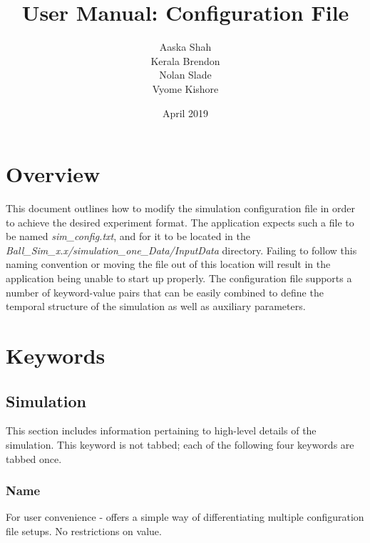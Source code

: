 \documentclass{article}
\title{User Manual: Configuration File}
\author{Aaska Shah\\Kerala Brendon\\Nolan Slade\\Vyome Kishore}
\date{April 2019}
\begin{document}
\maketitle

\section*{Overview}
This document outlines how to modify the simulation configuration file in order to achieve the desired experiment format. The application expects such a file to be named \textit{sim\_config.txt}, and for it to be located in the \textit{Ball\_Sim\_x.x\slash simulation\_one\_Data\slash InputData} directory. Failing to follow this naming convention or moving the file out of this location will result in the application being unable to start up properly. The configuration file supports a number of keyword-value pairs that can be easily combined to define the temporal structure of the simulation as well as auxiliary parameters. 

\section*{Keywords}
\subsection*{Simulation}
This section includes information pertaining to high-level details of the simulation. This keyword is not tabbed; each of the following four keywords are tabbed once.

\subsubsection*{Name} For user convenience - offers a simple way of differentiating multiple configuration file setups. No restrictions on value. 

%
\end{document}
